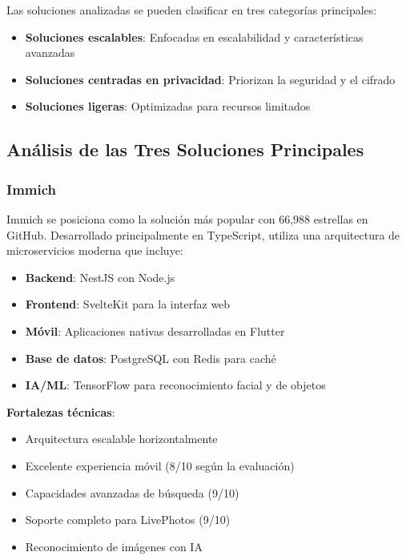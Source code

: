 Las soluciones analizadas se pueden clasificar en tres categorías principales:
\begin{itemize}
    \item \textbf{Soluciones escalables}: Enfocadas en escalabilidad y características avanzadas
    \item \textbf{Soluciones centradas en privacidad}: Priorizan la seguridad y el cifrado
    \item \textbf{Soluciones ligeras}: Optimizadas para recursos limitados
\end{itemize}

\subsection{Análisis de las Tres Soluciones Principales}

\subsubsection{Immich}

Immich se posiciona como la solución más popular con 66,988 estrellas en GitHub. Desarrollado principalmente en TypeScript, utiliza una arquitectura de microservicios moderna que incluye:

\begin{itemize}
    \item \textbf{Backend}: NestJS con Node.js
    \item \textbf{Frontend}: SvelteKit para la interfaz web
    \item \textbf{Móvil}: Aplicaciones nativas desarrolladas en Flutter
    \item \textbf{Base de datos}: PostgreSQL con Redis para caché
    \item \textbf{IA/ML}: TensorFlow para reconocimiento facial y de objetos
\end{itemize}

\textbf{Fortalezas técnicas}:
\begin{itemize}
    \item Arquitectura escalable horizontalmente
    \item Excelente experiencia móvil (8/10 según la evaluación)
    \item Capacidades avanzadas de búsqueda (9/10)
    \item Soporte completo para LivePhotos (9/10)
    \item Reconocimiento de imágenes con IA
\end{itemize}

